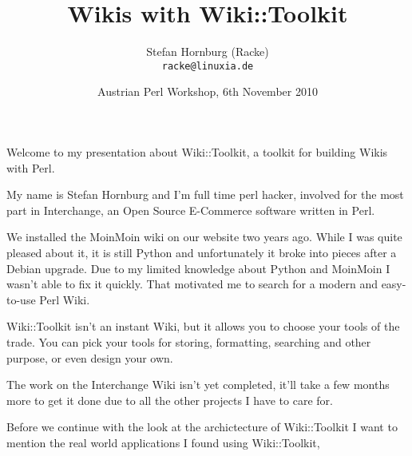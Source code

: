 
\usepackage[T1]{fontenc}
\usepackage{mathptmx}
\usepackage[scaled=.90]{helvet}
\usepackage{courier}

\usepackage{beamerthemesplit}
\usepackage{verbatim}
\usepackage{hyperref}
\usepackage{listings}
\lstset{language=Perl,basicstyle=\footnotesize,tabsize=3,showstringspaces=false}


\title{Wikis with Wiki::Toolkit}
\author[racke]{Stefan Hornburg (Racke)\\ \texttt{racke@linuxia.de}}
\date[OPW2010]{Austrian Perl Workshop, 6th November 2010}



\begin{frame}
  \titlepage
\end{frame}

\tableofcontents

Welcome to my presentation about Wiki::Toolkit, a toolkit for building
Wikis with Perl.

My name is Stefan Hornburg and I'm full time perl hacker, involved for
the most part in Interchange, an Open Source E-Commerce software 
written in Perl.

We installed the MoinMoin wiki on our website two years ago. While I was
quite pleased about it, it is still Python and unfortunately it broke 
into pieces after a Debian upgrade. Due to my limited knowledge about
Python and MoinMoin I wasn't able to fix it quickly.
That motivated me to search for a modern and easy-to-use Perl Wiki.

Wiki::Toolkit isn't an instant Wiki, but it allows you to choose
your tools of the trade. You can pick your tools for storing, formatting,
searching and other purpose, or even design your own.

The work on the Interchange Wiki isn't yet completed, it'll take a few
months more to get it done due to all the other projects I have to care
for.

Before we continue with the look at the archictecture of Wiki::Toolkit
I want to mention the real world applications I found using Wiki::Toolkit,

